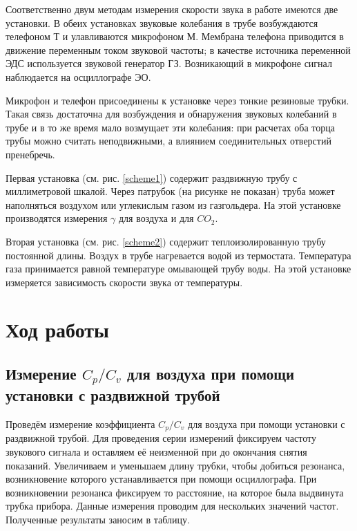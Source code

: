 \documentclass[12pt,a4paper]{article}
\newcommand{\figref}[1]{(см. рис. \ref{#1})}
\begin{document}
	Соответственно двум методам измерения скорости звука в работе имеются две установки.
	В обеих установках звуковые колебания в трубе возбуждаются телефоном Т и улавливаются микрофоном М.
	Мембрана телефона приводится в движение переменным током звуковой частоты; в качестве источника переменной ЭДС используется звуковой генератор ГЗ.
	Возникающий в микрофоне сигнал наблюдается на осциллографе ЭО.
	
	Микрофон и телефон присоединены к установке через тонкие резиновые трубки.
	Такая связь достаточна для возбуждения и обнаружения звуковых колебаний в трубе и в то же время мало возмущает эти колебания: при расчетах оба торца трубы можно считать неподвижными, а влиянием соединительных отверстий пренебречь.
	
	Первая установка \figref{scheme1} содержит раздвижную трубу с миллиметровой шкалой.
	Через патрубок (на рисунке не показан) труба может наполняться воздухом или углекислым газом из газгольдера.
	На этой установке производятся измерения $\gamma$ для воздуха и для $CO_2$.
	
	Вторая установка \figref{scheme2} содержит теплоизолированную трубу постоянной длины.
	Воздух в трубе нагревается водой из термостата.
	Температура газа принимается равной температуре омывающей трубу воды.
	На этой установке измеряется зависимость скорости звука от температуры.
	
	\section*{Ход работы}
	
		\subsection*{Измерение $ C_p/C_v $ для воздуха при помощи установки с раздвижной трубой}
		
		Проведём измерение коэффициента $ C_p/C_v $ для воздуха при помощи установки с раздвижной трубой.
		Для проведения серии измерений фиксируем частоту звукового сигнала и оставляем её неизменной при до окончания снятия показаний.
		Увеличиваем и уменьшаем длину трубки, чтобы добиться резонанса, возникновение которого устанавливается при помощи осциллографа.
		При возникновении резонанса фиксируем то расстояние, на которое была выдвинута трубка прибора.
		Данные измерения проводим для нескольких значений частот.
		Полученные результаты заносим в таблицу.
		
		
\end{document}
